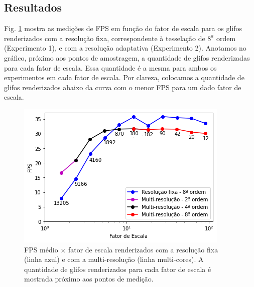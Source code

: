 

\subsection{Resultados}
\label{ssec::reais_resultados}



Fig. \ref{fig::fps_fatorescala} mostra as medições de FPS em função do fator de escala para os glifos renderizados com a resolução fixa, correspondente à tesselação de $8^a$  ordem (Experimento 1), e com a resolução adaptativa (Experimento 2). Anotamos no gráfico, próximo aos pontos de amostragem, a quantidade de glifos renderizadas para cada fator de escala. Essa quantidade é a mesma para ambos os experimentos em cada fator de escala. Por clareza, colocamos a quantidade de glifos renderizados abaixo da curva com o menor FPS para um dado fator de escala.

\begin{figure}[H]
    \centering
    \includegraphics[width=.65\linewidth, angle=0]{figs/Esquema_Glifo/Visual/FPS_fator_de_escala_legendado_2.png}
    \caption{FPS médio $\times$ fator de escala renderizados com a resolução fixa (linha azul) e com a multi-resolução (linha multi-cores). A quantidade de glifos renderizados para cada fator de escala é mostrada próximo aos pontos de medição.}
    \label{fig::fps_fatorescala}
\end{figure}

